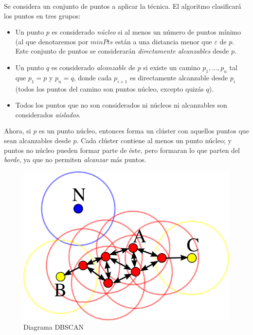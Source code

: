 \documentclass[a4paper, 12pt]{article}
\begin{document}
Se considera un conjunto de puntos a aplicar la t\'ecnica. El algoritmo clasificar\'a los puntos en tres grupos: \\

\begin{itemize}
	\item Un punto $p$ es considerado \textit{n\'ucleo} si al menos un n\'umero de puntos m\'inimo (al que denotaremos por $minPts$ est\'an a una distancia menor que $\varepsilon$ de $p$. Este conjunto de puntos se considerar\'an \textit{directamente alcanzables} desde $p$.
	\item Un punto $q$ es considerado \textit{alcanzable} de $p$ si existe un camino $p_1, \ldots, p_n$ tal que $p_1=p$ y $p_n=q$, donde cada $p_{i+1}$ es directamente alcanzable desde $p_i$ (todos los puntos del camino son puntos n\'ucleo, excepto quiz\'as $q$).
	\item Todos los puntos que no son considerados ni n\'ucleos ni alcanzables son considerados \textit{aislados}.
\end{itemize}

Ahora, si $p$ es un punto n\'ucleo, entonces forma un cl\'uster con aquellos puntos que sean alcanzables desde $p$. Cada cl\'uster contiene al menos un punto n\'ucleo; y puntos no n\'ucleo pueden formar parte de \'este, pero formaran lo que parten del \textit{borde}, ya que no permiten \textit{alcanzar} m\'as puntos. \\

\begin{figure}[H]\label{fig:DBSCAN}
	\centering
	\includegraphics[scale=.5]{DBSCAN.png}
\caption{Diagrama DBSCAN}
\end{figure}
\end{document}
